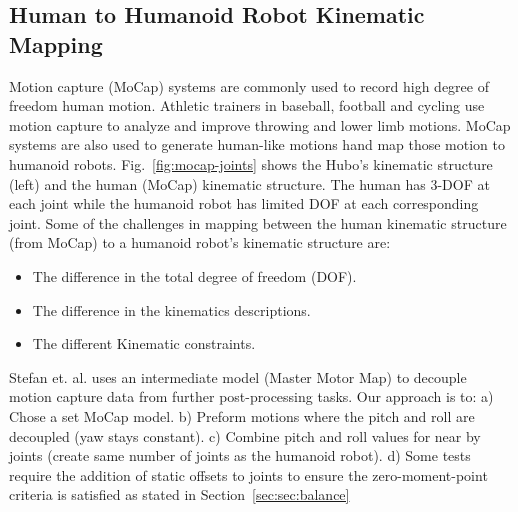 \subsection{Human to Humanoid Robot Kinematic Mapping}\label{sec:sec:mocap}

Motion capture (MoCap) systems are commonly used to record high degree of freedom human motion.  
Athletic trainers in baseball, football and cycling use motion capture to analyze and improve throwing and lower limb motions\cite{Fleisig1996,barrentiine1998,Mochizuki1998,Akira1999}.
MoCap systems are also used to generate human-like motions hand map those motion to humanoid robots\cite{1545060,Polland2002}.  
Fig.~\ref{fig:mocap-joints} shows the Hubo's kinematic structure (left) and the human (MoCap) kinematic structure.
The human has 3-DOF at each joint while the humanoid robot has limited DOF at each corresponding joint.
Some of the challenges in mapping between the human kinematic structure (from MoCap) to a humanoid robot's kinematic structure are:

\begin{itemize}
	\item The difference in the total degree of freedom (DOF). 
	\item	The difference in the kinematics descriptions. 
	\item	The different Kinematic constraints.
\end{itemize}

Stefan et. al.\cite{5756898} uses an intermediate model (Master Motor Map) to decouple motion capture data from further post-processing tasks. 
Our approach is to: a) Chose a set MoCap model.  b) Preform motions where the pitch and roll are decoupled (yaw stays constant).  c) Combine pitch and roll values for near by joints (create same number of joints as the humanoid robot).  d) Some tests require the addition of static offsets to joints to ensure the zero-moment-point criteria is satisfied as stated in Section~\ref{sec:sec:balance}




